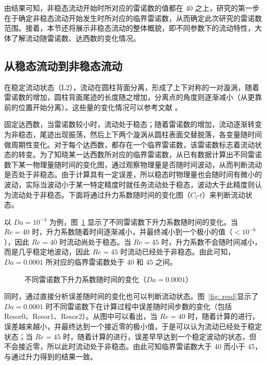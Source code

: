 由结果可知，非稳态流动开始时所对应的雷诺数的值都在 40 之上，研究的第一步在于确定非稳态流动开始发生时所对应的临界雷诺数，从而确定此次研究的雷诺数范围。接着，本节还将展示非稳态流动的整体概貌，即不同参数下的流动特性，大体了解流动随雷诺数、达西数的变化情况。

\subsection{从稳态流动到非稳态流动}

在稳定流动状态（L2），流动在圆柱背面分离，形成了上下对称的一对漩涡，随着雷诺数的增加，圆柱背面尾迹的长度随之增加，分离点的角度则逐渐减小（从更靠前的位置开始分离）。这些量的变化情况可以参考文献 \cite{}。

固定达西数，当雷诺数较小时，流动处于稳态；随着雷诺数的增加，流动逐渐转变为非稳态，尾迹出现振荡，然后上下两个漩涡从圆柱表面交替脱落，各变量随时间做周期性变化。对于每个达西数，都存在一个临界雷诺数，该雷诺数标志着流动状态的转变。为了知晓某一达西数所对应的临界雷诺数，从已有数据计算出不同雷诺数下某一物理量随时间的变化图，通过观察物理量是否随时间波动，从而判断流动是否处于非稳态。由于计算具有一定误差，所以稳态时物理量也会随时间有微小的波动，实际当波动小于某一特定精度时就任务流动处于稳态，波动大于此精度则认为流动处于非稳态。下面将通过升力系数随时间的变化图（$C_{\mathrm{l}}$-$t$）来判断流动状态。

以 $Da=10^{-4}$ 为例，图~\ref{fig: Cl_t} 显示了不同雷诺数下升力系数随时间的变化。当 $Re=40$ 时，升力系数随着时间逐渐减小，并最终减小到一个极小的值（$<10^{-6}$），因此 $Re=40$ 时流动尚处于稳态。当 $Re=45$ 时，升力系数不会随时间减小，而是几乎稳定地波动，因此 $Re=45$ 时流动已经处于非稳态。由此可知，$Da=0.0001$ 所对应的临界雷诺数处于 40 和 45 之间。

\begin{figure}
	\setlength{\subfigcapskip}{-1bp}
	\centering
	\begin{minipage}{\textwidth}
		\centering
	\end{minipage}
	\centering
	\begin{minipage}{\textwidth}
		\centering
	\end{minipage}
	\vspace{0.2em}
	\caption{不同雷诺数下升力系数随时间的变化（$Da=0.0001$）}
	\label{fig: Cl_t}
\end{figure}

同时，通过直接分析误差随时间的变化也可以判断流动状态。图~\ref{fig: resd}显示了 $Da=0.0001$ 时不同雷诺数下在计算过程中误差随时间步数的变化（包括 Resor0、Resor1、Resor2）。从图中可以看出，当 $Re=40$ 时，随着计算的进行，误差越来越小，并最终达到一个接近零的极小值，于是可以认为流动已经处于稳定状态；当 $Re=45$ 时，随着计算的进行，误差早早达到一个稳定波动的状态，但不会接近零，所以此时流动处于非稳态。由此可知临界雷诺数大于 40 而小于 45，与通过升力得到的结果一致。

